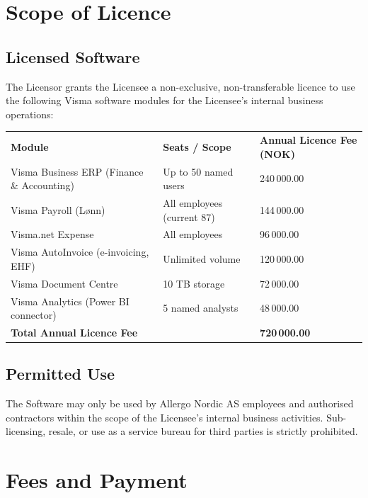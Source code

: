 \documentclass[a4paper,11pt]{article}
\begin{document}
\section{Scope of Licence}

\subsection{Licensed Software}
The Licensor grants the Licensee a non-exclusive, non-transferable licence to use the following
Visma software modules for the Licensee's internal business operations:

\vspace{8pt}
\begin{tabular}{lll}
  \rowcolor{brand}
  \color{white}\textbf{Module} & \color{white}\textbf{Seats / Scope} & \color{white}\textbf{Annual Licence Fee (NOK)} \\
  \rowcolor{lightgray}
  Visma Business ERP (Finance \& Accounting) & Up to 50 named users & 240\,000.00 \\
  Visma Payroll (Lønn) & All employees (current 87) & 144\,000.00 \\
  \rowcolor{lightgray}
  Visma.net Expense & All employees & 96\,000.00 \\
  Visma AutoInvoice (e-invoicing, EHF) & Unlimited volume & 120\,000.00 \\
  \rowcolor{lightgray}
  Visma Document Centre & 10 TB storage & 72\,000.00 \\
  Visma Analytics (Power BI connector) & 5 named analysts & 48\,000.00 \\
  \midrule
  \textbf{Total Annual Licence Fee} & & \textbf{720\,000.00} \\
  \bottomrule
\end{tabular}

\subsection{Permitted Use}
The Software may only be used by Allergo Nordic AS employees and authorised contractors
within the scope of the Licensee's internal business activities. Sub-licensing, resale,
or use as a service bureau for third parties is strictly prohibited.

\section{Fees and Payment}
\end{document}
